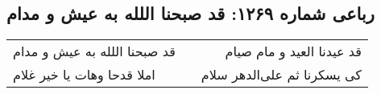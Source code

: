 \begin{center}
\section*{رباعی شماره ۱۲۶۹: قد صبحنا اللله به عیش و مدام}
\label{sec:1269}
\begin{longtable}{l p{0.5cm} r}
قد صبحنا اللله به عیش و مدام
&&
قد عیدنا العید و مام صیام
\\
املا قدحا وهات یا خیر غلام
&&
کی یسکرنا ثم علی‌الدهر سلام
\\
\end{longtable}
\end{center}
